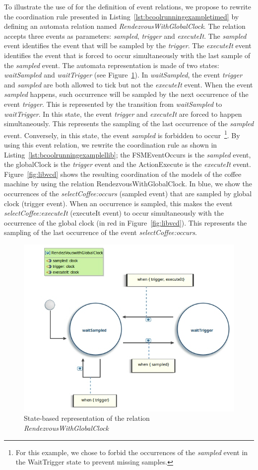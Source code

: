 To illustrate the use of \moccml for the definition of event relations, we propose to rewrite the coordination rule presented in Listing~\ref{lst:bcoolrunningexampletimed} by defining an automata relation named \emph{RendezvousWithGlobalClock}. The relation accepts three events as parameters: \emph{sampled}, \emph{trigger} and \emph{executeIt}. The \emph{sampled} event identifies the event that will be sampled by the \emph{trigger}. The \emph{executeIt} event identifies the event that is forced to occur simultaneously with the last sample of the \emph{sampled} event. The automata representation is made of two states: \emph{waitSampled} and \emph{waitTrigger} (see Figure~\ref{fig:moccmllib}). In \emph{waitSampled}, the event \emph{trigger} and \emph{sampled} are both allowed to tick but not the \emph{executeIt} event. When the event \emph{sampled} happens, such occurrence will be sampled by the next occurrence of the event \emph{trigger}. This is represented by the transition from \emph{waitSampled} to \emph{waitTrigger}. In this state, the event \emph{trigger} and \emph{executeIt} are forced to happen simultaneously. This represents the sampling of the last occurrence of the \emph{sampled} event. Conversely, in this state, the event \emph{sampled} is forbidden to occur~\footnote{For this example, we chose to forbid the occurrences of the \emph{sampled} event in the WaitTrigger state to prevent missing samples.}. By using this event relation, we rewrite the coordination rule as shown in Listing~\ref{lst:bcoolrunningexamplellib}; the FSMEventOccurs is the \emph{sampled} event, the globalClock is the \emph{trigger} event and the ActionExecute is the \emph{executeIt} event. Figure~\ref{fig:libvcd} shows the resulting coordination of the models of the coffee machine by using the relation RendezvousWithGlobalClock. In blue, we show the occurrences of the \emph{selectCoffee:occurs} (sampled event) that are sampled by global clock (trigger event). When an occurrence is sampled, this makes the event \emph{selectCoffee:executeIt} (executeIt event) to occur simultaneously with the occurrence of the global clock (in red in Figure~\ref{fig:libvcd}). This represents the sampling of the last occurrence of the event \emph{selectCoffee:occurs}.   

\begin{figure}
	\center
	\includegraphics[width=.7\textwidth]{bcool/figs/moccmllib.jpg}
	\caption{State-based representation of the relation \emph{RendezvousWithGlobalClock}}
	\label{fig:moccmllib}
\end{figure}

